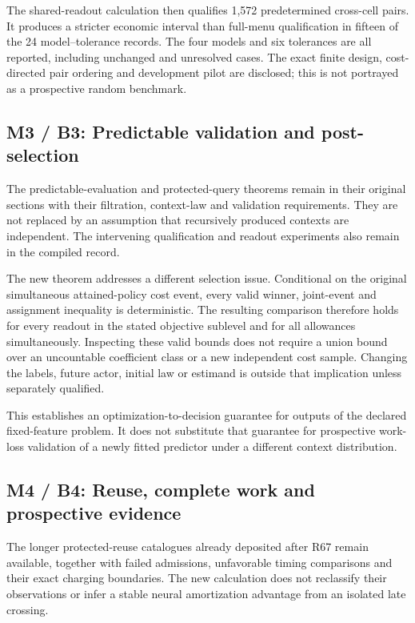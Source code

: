 The shared-readout calculation then qualifies 1,572 predetermined
cross-cell pairs. It produces a stricter economic interval than
full-menu qualification in fifteen of the 24 model--tolerance records.
The four models and six tolerances are all reported, including unchanged
and unresolved cases. The exact finite design, cost-directed pair
ordering and development pilot are disclosed; this is not portrayed as a
prospective random benchmark.

\hypertarget{m3-b3-predictable-validation-and-post-selection}{%
\subsection{M3 / B3: Predictable validation and
post-selection}\label{m3-b3-predictable-validation-and-post-selection}}

The predictable-evaluation and protected-query theorems remain in their
original sections with their filtration, context-law and validation
requirements. They are not replaced by an assumption that recursively
produced contexts are independent. The intervening qualification and
readout experiments also remain in the compiled record.

The new theorem addresses a different selection issue. Conditional on
the original simultaneous attained-policy cost event, every valid
winner, joint-event and assignment inequality is deterministic. The
resulting comparison therefore holds for every readout in the stated
objective sublevel and for all allowances simultaneously. Inspecting
these valid bounds does not require a union bound over an uncountable
coefficient class or a new independent cost sample. Changing the labels,
future actor, initial law or estimand is outside that implication unless
separately qualified.

This establishes an optimization-to-decision guarantee for outputs of
the declared fixed-feature problem. It does not substitute that
guarantee for prospective work-loss validation of a newly fitted
predictor under a different context distribution.

\hypertarget{m4-b4-reuse-complete-work-and-prospective-evidence}{%
\subsection{M4 / B4: Reuse, complete work and prospective
evidence}\label{m4-b4-reuse-complete-work-and-prospective-evidence}}

The longer protected-reuse catalogues already deposited after R67 remain
available, together with failed admissions, unfavorable timing
comparisons and their exact charging boundaries. The new calculation
does not reclassify their observations or infer a stable neural
amortization advantage from an isolated late crossing.

